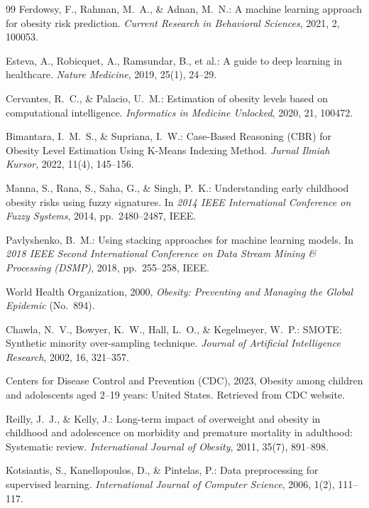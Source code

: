 \documentclass[12pt, a4paper]{article}
\begin{document}
\begin{thebibliography}{99}
Ferdowsy, F., Rahman, M.~A., \& Adnan, M.~N.: A machine learning approach for obesity
risk prediction. \textit{Current Research in Behavioral Sciences}, 2021, 2, 100053.

Esteva, A., Robicquet, A., Ramsundar, B., et al.: A guide to deep learning in
healthcare. \textit{Nature Medicine}, 2019, 25(1), 24--29.

Cervantes, R.~C., \& Palacio, U.~M.: Estimation of obesity levels based on
computational intelligence. \textit{Informatics in Medicine Unlocked}, 2020, 21, 100472.

Bimantara, I.~M.~S., \& Supriana, I.~W.: Case-Based Reasoning (CBR) for Obesity Level
Estimation Using K-Means Indexing Method. \textit{Jurnal Ilmiah Kursor}, 2022, 11(4),
145--156.

Manna, S., Rana, S., Saha, G., \& Singh, P.~K.: Understanding early childhood obesity
risks using fuzzy signatures. In \textit{2014 IEEE International Conference on Fuzzy
Systems}, 2014, pp.\ 2480--2487, IEEE.

Pavlyshenko, B.~M.: Using stacking approaches for machine learning models. In
\textit{2018 IEEE Second International Conference on Data Stream Mining \& Processing
(DSMP)}, 2018, pp.\ 255--258, IEEE.

World Health Organization, 2000, \textit{Obesity: Preventing and Managing the Global
Epidemic} (No.\ 894).

Chawla, N.~V., Bowyer, K.~W., Hall, L.~O., \& Kegelmeyer, W.~P.: SMOTE: Synthetic
minority over-sampling technique. \textit{Journal of Artificial Intelligence Research},
2002, 16, 321--357.

Centers for Disease Control and Prevention (CDC), 2023, Obesity among children and
adolescents aged 2--19 years: United States. Retrieved from CDC website.

Reilly, J.~J., \& Kelly, J.: Long-term impact of overweight and obesity in childhood and
adolescence on morbidity and premature mortality in adulthood: Systematic review.
\textit{International Journal of Obesity}, 2011, 35(7), 891--898.

Kotsiantis, S., Kanellopoulos, D., \& Pintelas, P.: Data preprocessing for supervised
learning. \textit{International Journal of Computer Science}, 2006, 1(2), 111--117.


\end{thebibliography}
\end{document}

